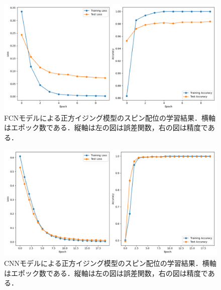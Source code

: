 \documentclass[a4paper,11pt]{jsreport}
\begin{document}
\begin{figure}[H]
  \begin{center}
    \includegraphics[width=\linewidth]{image/plot_square_FCNN_2.png}
    \caption{FCNモデルによる正方イジング模型のスピン配位の学習結果．横軸はエポック数である．縦軸は左の図は誤差関数，右の図は精度である．}
    \label{正方イジングFCNloss}
  \end{center}
\end{figure}
\begin{figure}[H]
  \begin{center}
    \includegraphics[width=\linewidth]{image/plot_square_CNN_2.png}
    \caption{CNNモデルによる正方イジング模型のスピン配位の学習結果．横軸はエポック数である．縦軸は左の図は誤差関数，右の図は精度である．}
    \label{正方イジングCNNloss}
  \end{center}
\end{figure}
\end{document}
